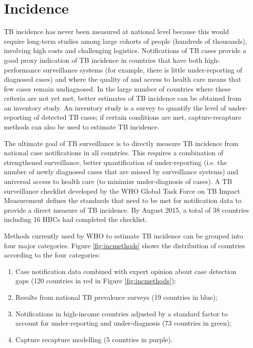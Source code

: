 \section{Incidence}

TB incidence has never been measured at national level because this would require long-term studies among large cohorts of people (hundreds of thousands), involving high costs and challenging logistics. Notifications of TB cases provide a good proxy indication of TB incidence in countries that have both high-performance surveillance systems (for example, there is little under-reporting of diagnosed cases) and where the quality of and access to health care means that few cases remain undiagnosed. In the large number of countries where these criteria are not yet met, better estimates of TB incidence can be obtained from an inventory study. An inventory study is a survey to quantify the level of under-reporting of detected TB cases; if certain conditions are met, capture-recapture methods can also be used to estimate TB incidence\cite{WHO2012}. 

The ultimate goal of TB surveillance is to directly measure TB incidence from national case notifications in all countries. This requires a combination of strengthened surveillance, better quantification of under-reporting (i.e. the number of newly diagnosed cases that are missed by surveillance systems) and universal access to health care (to minimize under-diagnosis of cases). A TB surveillance checklist developed by the WHO Global Task Force on TB Impact Measurement defines the standards that need to be met for notification data to provide a direct measure of TB incidence\cite{WHO2014}. By August 2015, a total of 38 countries including 16 HBCs had completed the checklist. 

Methods currently used by WHO to estimate TB incidence can be grouped into four major categories. Figure \ref{fig:incmethods} shows the distribution of countries according to the four categories: 

\begin{enumerate}
\item Case notification data combined with expert opinion about case detection gaps (120 countries in red in Figure \ref{fig:incmethods});
\item Results from national TB prevalence surveys (19 countries in blue);
\item Notifications in high-income countries adjusted by a standard factor to account for under-reporting and under-diagnosis (73 countries in green);
\item Capture recapture modelling (5 countries in purple).
\end{enumerate}






  
  
  
  
  
  
  
  
  
  